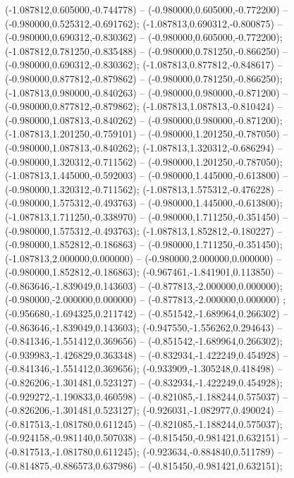  (-1.087812,0.605000,-0.744778) -- (-0.980000,0.605000,-0.772200) -- (-0.980000,0.525312,-0.691762);
 (-1.087813,0.690312,-0.800875) -- (-0.980000,0.690312,-0.830362) -- (-0.980000,0.605000,-0.772200);
 (-1.087812,0.781250,-0.835488) -- (-0.980000,0.781250,-0.866250) -- (-0.980000,0.690312,-0.830362);
 (-1.087813,0.877812,-0.848617) -- (-0.980000,0.877812,-0.879862) -- (-0.980000,0.781250,-0.866250);
 (-1.087813,0.980000,-0.840263) -- (-0.980000,0.980000,-0.871200) -- (-0.980000,0.877812,-0.879862);
 (-1.087813,1.087813,-0.810424) -- (-0.980000,1.087813,-0.840262) -- (-0.980000,0.980000,-0.871200);
 (-1.087813,1.201250,-0.759101) -- (-0.980000,1.201250,-0.787050) -- (-0.980000,1.087813,-0.840262);
 (-1.087813,1.320312,-0.686294) -- (-0.980000,1.320312,-0.711562) -- (-0.980000,1.201250,-0.787050);
 (-1.087813,1.445000,-0.592003) -- (-0.980000,1.445000,-0.613800) -- (-0.980000,1.320312,-0.711562);
 (-1.087813,1.575312,-0.476228) -- (-0.980000,1.575312,-0.493763) -- (-0.980000,1.445000,-0.613800);
 (-1.087813,1.711250,-0.338970) -- (-0.980000,1.711250,-0.351450) -- (-0.980000,1.575312,-0.493763);
 (-1.087813,1.852812,-0.180227) -- (-0.980000,1.852812,-0.186863) -- (-0.980000,1.711250,-0.351450);
 (-1.087813,2.000000,0.000000) -- (-0.980000,2.000000,0.000000) -- (-0.980000,1.852812,-0.186863);
 (-0.967461,-1.841901,0.113850) -- (-0.863646,-1.839049,0.143603) -- (-0.877813,-2.000000,0.000000);
 (-0.980000,-2.000000,0.000000) -- (-0.877813,-2.000000,0.000000) ;
 (-0.956680,-1.694325,0.211742) -- (-0.851542,-1.689964,0.266302) -- (-0.863646,-1.839049,0.143603);
 (-0.947550,-1.556262,0.294643) -- (-0.841346,-1.551412,0.369656) -- (-0.851542,-1.689964,0.266302);
 (-0.939983,-1.426829,0.363348) -- (-0.832934,-1.422249,0.454928) -- (-0.841346,-1.551412,0.369656);
 (-0.933909,-1.305248,0.418498) -- (-0.826206,-1.301481,0.523127) -- (-0.832934,-1.422249,0.454928);
 (-0.929272,-1.190833,0.460598) -- (-0.821085,-1.188244,0.575037) -- (-0.826206,-1.301481,0.523127);
 (-0.926031,-1.082977,0.490024) -- (-0.817513,-1.081780,0.611245) -- (-0.821085,-1.188244,0.575037);
 (-0.924158,-0.981140,0.507038) -- (-0.815450,-0.981421,0.632151) -- (-0.817513,-1.081780,0.611245);
 (-0.923634,-0.884840,0.511789) -- (-0.814875,-0.886573,0.637986) -- (-0.815450,-0.981421,0.632151);
